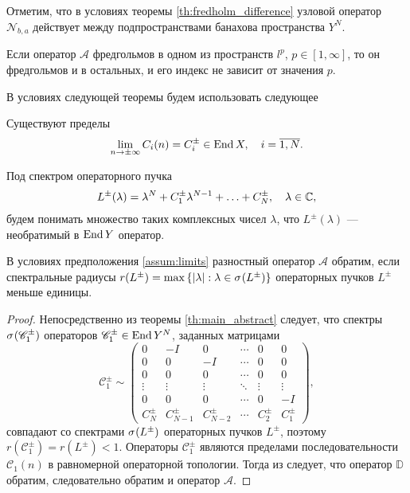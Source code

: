Отметим, что в условиях теоремы \ref{th:fredholm_difference} узловой оператор $\mathcal N_{b, a}$ действует между подпространствами банахова пространства $Y^N$.

\begin{corollary}
    Если оператор $\mathcal A$ фредгольмов в одном из пространств $l^p$, $p \in [1, \infty]$, то он фредгольмов и в остальных, и его индекс не зависит от значения $p$.
\end{corollary}

В условиях следующей теоремы будем использовать следующее
\begin{assumption}\label{assum:limits}
    Существуют пределы
    \[ \lim_{n\to\pm\infty} C_i(n) = C_i^\pm \in \operatorname{End} X, \quad i = \overline{1,N}. \]
\end{assumption}

Под спектром операторного пучка
\[L^\pm(\lambda) = \lambda^N + C_1^\pm \lambda^{N-1} + \dotsc + C_N^\pm, \quad \lambda \in \mathbb{C}, \]
будем понимать множество таких комплексных чисел $\lambda$, что $L^\pm(\lambda)$ --- необратимый в $\operatorname{End} Y$ оператор.

\begin{theorem}
    В условиях предположения \ref{assum:limits} разностный оператор $\mathcal A$ обратим, если спектральные радиусы $r(L^\pm) = \max\menge{\absv{\lambda} : \lambda \in \spectrum{L^\pm}}$ операторных пучков $L^\pm$ меньше единицы.
\end{theorem}

\begin{proof}
    Непосредственно из теоремы \ref{th:main_abstract} следует, что спектры $\spectrum{\mathcal C_1^\pm}$ операторов $\mathcal C_1^\pm \in \operatorname{End} Y^N$, заданных матрицами
    \[\mathcal C_1^\pm \sim \begin{pmatrix}
    0 & -I & 0  & \cdots & 0 & 0 \\
    0 & 0  & -I & \cdots & 0 & 0 \\
    0 & 0  & 0 & \cdots & 0 & 0 \\
    \vdots & \vdots & \vdots & \ddots & \vdots & \vdots \\
    0 & 0 & 0 & \cdots & 0 & -I \\
    C_N^\pm & C_{N-1}^\pm & C_{N-2}^\pm & \cdots & C_2^\pm & C_1^\pm
   \end{pmatrix},\]
    совпадают со спектрами $\spectrum{L^\pm}$ операторных пучков $L^\pm$, поэтому $r(\mathcal C_1^\pm) = r(L^\pm) < 1$.
    Операторы $\mathcal C_1^\pm$ являются пределами последовательности $\mathcal C_1(n)$ в равномерной операторной топологии.
    Тогда из \cite[теорема 3]{Bas00} следует, что оператор $\mathbb D$ обратим, следовательно обратим и оператор $\mathcal A$.
\end{proof}


